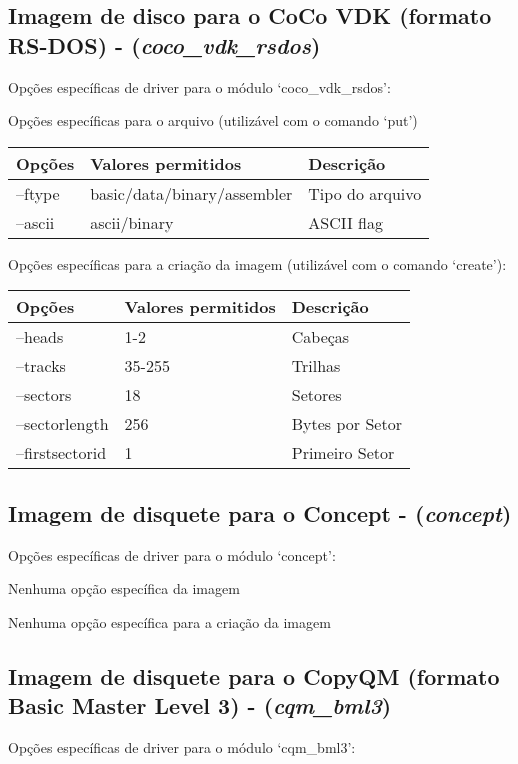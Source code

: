 \documentclass[letterpaper,10pt,brazil]{sphinxmanual}
\begin{document}
\subsection{Imagem de disco para o CoCo VDK (formato RS-DOS) - (\emph{coco\_vdk\_rsdos})}
\label{tools/imgtool:imagem-de-disco-para-o-coco-vdk-formato-rs-dos-coco-vdk-rsdos}
Opções específicas de driver para o módulo `coco\_vdk\_rsdos':

Opções específicas para o arquivo (utilizável com o comando `put')

\noindent\begin{tabulary}{\linewidth}{|L|L|L|}
\hline

Opções
&
Valores permitidos
&
Descrição
\\
\hline
--ftype
&
basic/data/binary/assembler
&
Tipo do arquivo
\\
\hline
--ascii
&
ascii/binary
&
ASCII flag
\\
\hline\end{tabulary}


Opções específicas para a criação da imagem (utilizável com o comando `create'):

\noindent\begin{tabulary}{\linewidth}{|L|L|L|}
\hline

Opções
&
Valores permitidos
&
Descrição
\\
\hline
--heads
&
1-2
&
Cabeças
\\
\hline
--tracks
&
35-255
&
Trilhas
\\
\hline
--sectors
&
18
&
Setores
\\
\hline
--sectorlength
&
256
&
Bytes por Setor
\\
\hline
--firstsectorid
&
1
&
Primeiro Setor
\\
\hline\end{tabulary}



\subsection{Imagem de disquete para o Concept - (\emph{concept})}
\label{tools/imgtool:imagem-de-disquete-para-o-concept-concept}
Opções específicas de driver para o módulo `concept':

Nenhuma opção específica da imagem

Nenhuma opção específica para a criação da imagem


\subsection{Imagem de disquete para o CopyQM (formato Basic Master Level 3) - (\emph{cqm\_bml3})}
\label{tools/imgtool:imagem-de-disquete-para-o-copyqm-formato-basic-master-level-3-cqm-bml3}
Opções específicas de driver para o módulo `cqm\_bml3':
\end{document}
